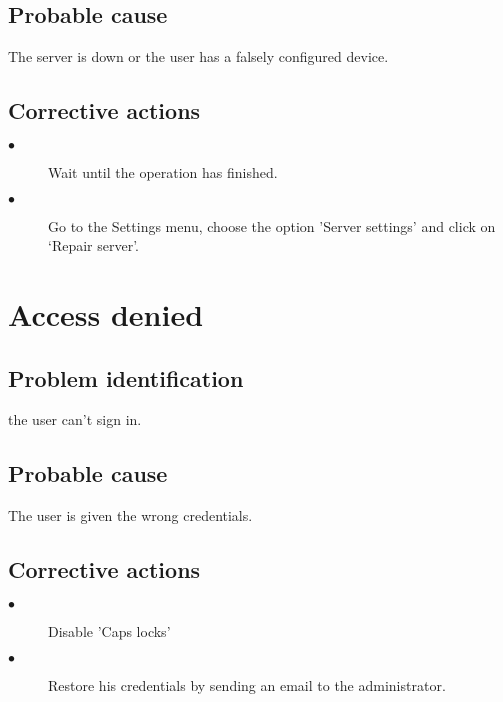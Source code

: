 \subsection{Probable cause}
The server is down or the user has a falsely configured device.

\subsection{Corrective actions}
\begin{description} 
\item[$\bullet$] Wait until the operation has finished.
\item[$\bullet$] Go to the Settings menu, choose the option 'Server settings'
and click on `Repair server'.
\end{description} 

\section{Access denied}

\subsection{Problem identification}
the user can't sign in.

\subsection{Probable cause}
The user is given the wrong credentials.

\subsection{Corrective actions}
\begin{description} 
\item[$\bullet$] Disable 'Caps locks'
\item[$\bullet$] Restore his credentials by sending an email to the
administrator.
\end{description}
